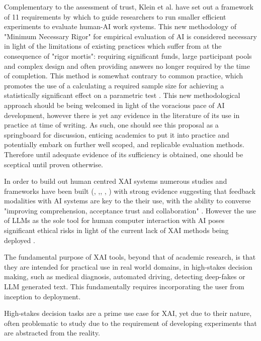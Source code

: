 Complementary to the assessment of trust, Klein et al. \cite{kleinMinimumNecessaryRigor2023} have set out a framework of 11 requirements by which to guide researchers to run smaller efficient experiments to evaluate human-AI work systems. This new methodology of "Minimum Necessary Rigor" for empirical evaluation of AI is considered necessary in light of the limitations of existing practices which suffer from at the consequence of "rigor mortis": requiring significant funds, large participant pools and complex design and often providing answers no longer required by the time of completion. This method is somewhat contrary to common practice, which promotes the use of a calculating a required sample size for achieving a statistically significant effect on a parametric test \cite{erdfelderGPOWERGeneralPower1996}. This new methodological approach should be being welcomed in light of the voracious pace of AI development, however there is yet any evidence in the literature of its use in practice at time of writing. As such, one should see this proposal as a springboard for discussion, enticing academics to put it into practice and potentially embark on further well scoped, and replicable evaluation methods. Therefore until adequate evidence of its sufficiency is obtained, one should be sceptical until proven otherwise.

In order to build out human centred XAI systems numerous studies and frameworks have been built (\cite{mohseniMultidisciplinarySurveyFramework2021}, \cite{uenoTrustHumanAIInteraction2022},\cite{hoffmanIncreasingValueXAI2023}, \cite{hoffmanMeasuresExplainableAI2023}, \cite{collinsHumanUncertaintyConceptBased2023}) with strong evidence suggesting that feedback modalities with AI systems are key to the their use, with the ability to converse "improving comprehension, acceptance trust and collaboration" \cite{zhangMayAskFollowup2023}. However the use of LLMs as the sole tool for human computer interaction with AI poses significant ethical risks in light of the current lack of XAI methods being deployed \cite{zhaoExplainabilityLargeLanguage2023}.

The fundamental purpose of XAI tools, beyond that of academic research, is that they are intended for practical use in real world domains, in high-stakes decision making, such as medical diagnosis, automated driving, detecting deep-fakes or LLM generated text. This fundamentally requires incorporating the user from inception to deployment. 

High-stakes decision tasks are a prime use case for XAI, yet due to their nature, often problematic to study due to the requirement of developing experiments that are abstracted from the reality.

